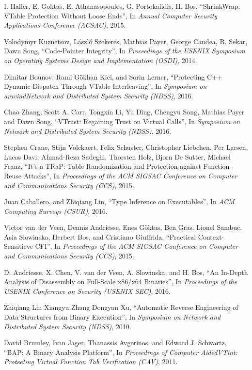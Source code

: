\documentclass[11pt,a4paper,bibtotoc,idxtotoc,headsepline,footsepline,footexclude,BCOR20mm,DIV10]{scrbook}
\begin{document}
\begin{thebibliography}{50}
I. Haller, E. Goktas, E. Athanasopoulos, G. Portokalidis, H. Bos,
``{ShrinkWrap: VTable Protection Without Loose Ends}'', In
\emph{Annual Computer Security Applications Conference (ACSAC)}, 2015.

Volodymyr Kuznetsov, László Szekeres, Mathias Payer, George Candea, R. Sekar, Dawn Song,
``{Code-Pointer Integrity}'', In
\emph{Proceedings of the USENIX Symposium on Operating Systems Design and Implementation (OSDI)}, 2014.

Dimitar Bounov, Rami Gökhan Kici, and Sorin Lerner,
``{Protecting C++ Dynamic Dispatch Through VTable Interleaving}'', In
\emph{Symposium on aravindNetwork and Distributed System Security (NDSS)}, 2016.

Chao Zhang, Scott A. Carr, Tongxin Li, Yu Ding, Chengyu Song, Mathias Payer and Dawn Song,
``{VTrust: Regaining Trust on Virtual Calls}'', In
\emph{Symposium on Network and Distributed System Security (NDSS)}, 2016.

Stephen Crane, Stijn Volckaert, Felix Schuster, Christopher Liebchen, Per Larsen,
Lucas Davi, Ahmad-Reza Sadeghi, Thorsten Holz, Bjorn De Sutter, Michael Franz,
``{It’s a TRaP: Table Randomization and Protection against Function-Reuse Attacks}'', In
\emph{Proceedings of the ACM SIGSAC Conference on Computer and Communications Security (CCS)}, 2015.

Juan Caballero, and Zhiqiang Lin,
``{Type Inference on Executables}'', In
\emph{ACM Computing Surveys (CSUR)}, 2016.

Victor van der Veen, Dennis Andriesse, Enes Göktas, Ben Gras.
Lionel Sambuc, Asia Slowinska, Herbert Bos, and Cristiano Giuffrida,
``{Practical Context-Sensiticve CFI}'', In
\emph{Proceedings of the ACM SIGSAC Conference on Computer and Communications Security (CCS)}, 2015.

D. Andriesse, X. Chen, V. van der Veen, A. Slowinska, and H. Bos, 
``{An In-Depth Analysis of Disassembly on Full-Scale x86/x64 Binaries}'', In
\emph{Proceedings of the USENIX Conference on Security (USENIX SEC)}, 2016.

Zhiqiang Lin Xiangyu Zhang Dongyan Xu,
``{Automatic Reverse Engineering of Data Structures from Binary Execution}'', In
\emph{Symposium on Network and Distributed System Security (NDSS)}, 2010.

David Brumley, Ivan Jager, Thanassis Avgerinos, and Edward J. Schwartz,
``{BAP: A Binary Analysis Platform}'', 
In \emph{Proceedings of Computer AidedVTint: Protecting Virtual Function Tab Verification (CAV)}, 2011.


\end{thebibliography}
\end{document}
